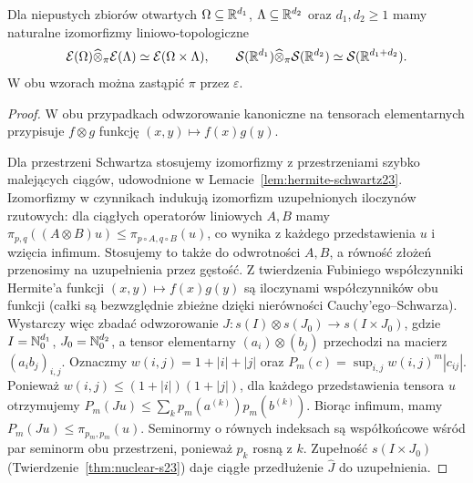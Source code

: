 \begin{twierdzenie}
\label{thm:smooth-schwartz-tensor24}
Dla niepustych zbiorów otwartych $\Omega\subseteq\mathbb R^{d_1}$,
$\Lambda\subseteq\mathbb R^{d_2}$ oraz $d_1,d_2\ge1$ mamy
naturalne izomorfizmy liniowo-topologiczne
\[
 \mathcal E(\Omega)\widehat\otimes_\pi\mathcal E(\Lambda)
 \simeq \mathcal E(\Omega\times\Lambda),\qquad
 \mathcal S(\mathbb R^{d_1})\widehat\otimes_\pi\mathcal S(\mathbb R^{d_2})
 \simeq \mathcal S(\mathbb R^{d_1+d_2}).
\]
W obu wzorach można zastąpić $\pi$ przez $\varepsilon$.
\end{twierdzenie}
\begin{proof}
W obu przypadkach odwzorowanie kanoniczne na tensorach
elementarnych przypisuje $f\otimes g$ funkcję
$(x,y)\mapsto f(x)g(y)$.

Dla przestrzeni Schwartza stosujemy izomorfizmy z
przestrzeniami szybko malejących ciągów, udowodnione
w Lemacie~\ref{lem:hermite-schwartz23}.
Izomorfizmy w czynnikach indukują izomorfizm
uzupełnionych iloczynów rzutowych: dla ciągłych
operatorów liniowych $A,B$ mamy
$\pi_{p,q}((A\otimes B)u)\le\pi_{p\circ A,q\circ B}(u)$,
co wynika z każdego przedstawienia $u$ i wzięcia
infimum. Stosujemy to także do odwrotności $A,B$,
a równość złożeń przenosimy na uzupełnienia przez gęstość.
Z twierdzenia Fubiniego współczynniki Hermite'a
funkcji $(x,y)\mapsto f(x)g(y)$ są iloczynami
współczynników obu funkcji (całki są bezwzględnie
zbieżne dzięki nierówności Cauchy'ego--Schwarza).
Wystarczy więc zbadać odwzorowanie
$J:s(I)\otimes s(J_0)\to s(I\times J_0)$,
gdzie $I=\mathbb N_0^{d_1}$, $J_0=\mathbb N_0^{d_2}$,
a tensor elementarny $(a_i)\otimes(b_j)$
przechodzi na macierz $(a_i b_j)_{i,j}$.
Oznaczmy $w(i,j)=1+|i|+|j|$ oraz
$P_m(c)=\sup_{i,j}w(i,j)^m|c_{ij}|$.
Ponieważ $w(i,j)\le(1+|i|)(1+|j|)$,
dla każdego przedstawienia tensora $u$ otrzymujemy
$P_m(Ju)\le\sum_k p_m(a^{(k)})p_m(b^{(k)})$.
Biorąc infimum, mamy
$P_m(Ju)\le\pi_{p_m,p_m}(u)$.
Seminormy o równych indeksach są współkońcowe
wśród par seminorm obu przestrzeni, ponieważ
$p_k$ rosną z $k$. Zupełność $s(I\times J_0)$
(Twierdzenie~\ref{thm:nuclear-s23}) daje ciągłe
przedłużenie $\widehat J$ do uzupełnienia.


\end{proof}
